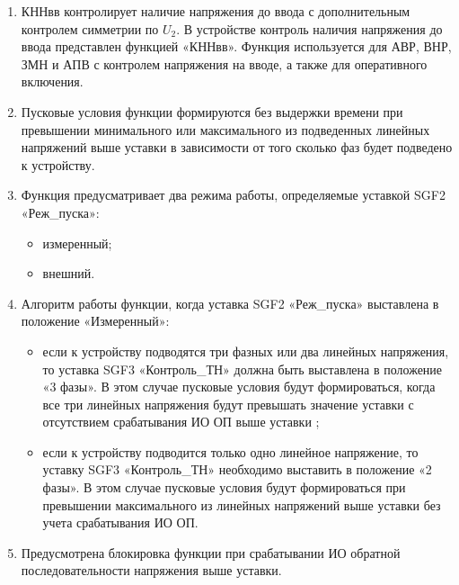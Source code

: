 
\color{black}

\begin{enumerate}

\item
КННвв контролирует наличие напряжения до ввода с дополнительным контролем симметрии по $U_2$. В устройстве контроль наличия напряжения до ввода представлен функцией «КННвв». Функция используется для АВР, ВНР, ЗМН и АПВ с контролем напряжения на вводе, а также для оперативного включения.

\item
Пусковые условия функции формируются без выдержки времени при превышении минимального или максимального из подведенных линейных напряжений выше уставки в зависимости от того сколько фаз будет подведено к устройству.

\item
Функция предусматривает два режима работы, определяемые уставкой SGF2 «Реж\_пуска»:
\begin{itemize}
    \item измеренный;
    \item внешний.
\end{itemize}

\item
Алгоритм работы функции, когда уставка SGF2 «Реж\_пуска» выставлена в положение «Измеренный»:
\begin{itemize}
    \item если к устройству подводятся три фазных или два линейных напряжения, то уставка SGF3 «Контроль\_ТН» должна быть выставлена в положение «3 фазы». В этом случае пусковые условия будут формироваться, когда все три линейных напряжения будут превышать значение уставки с отсутствием срабатывания ИО ОП выше уставки ;
    \item если к устройству подводится только одно линейное напряжение, то уставку SGF3 «Контроль\_ТН» необходимо выставить в положение «2 фазы». В этом случае пусковые условия будут формироваться при превышении максимального из линейных напряжений выше уставки без учета срабатывания ИО ОП.
\end{itemize}

\item
Предусмотрена блокировка функции при срабатывании ИО обратной последовательности напряжения выше уставки.


\end{enumerate}
